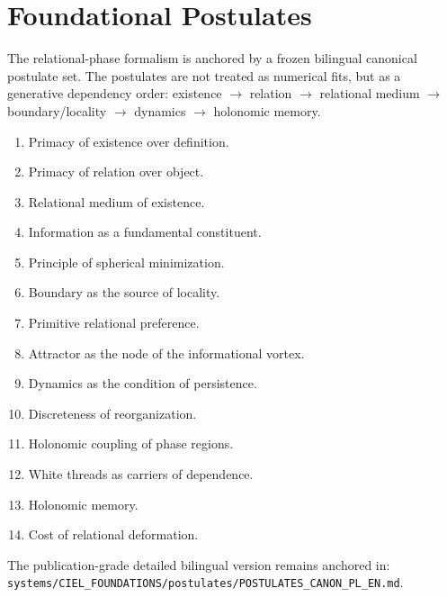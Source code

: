 \section{Foundational Postulates}\label{sec:foundational-postulates}

The relational-phase formalism is anchored by a frozen bilingual canonical postulate set.
The postulates are not treated as numerical fits, but as a generative dependency order:
existence $\rightarrow$ relation $\rightarrow$ relational medium $\rightarrow$ boundary/locality $\rightarrow$ dynamics $\rightarrow$ holonomic memory.

\begin{enumerate}
  \item Primacy of existence over definition.
  \item Primacy of relation over object.
  \item Relational medium of existence.
  \item Information as a fundamental constituent.
  \item Principle of spherical minimization.
  \item Boundary as the source of locality.
  \item Primitive relational preference.
  \item Attractor as the node of the informational vortex.
  \item Dynamics as the condition of persistence.
  \item Discreteness of reorganization.
  \item Holonomic coupling of phase regions.
  \item White threads as carriers of dependence.
  \item Holonomic memory.
  \item Cost of relational deformation.
\end{enumerate}

The publication-grade detailed bilingual version remains anchored in:
\texttt{systems/CIEL\_FOUNDATIONS/postulates/POSTULATES\_CANON\_PL\_EN.md}.
